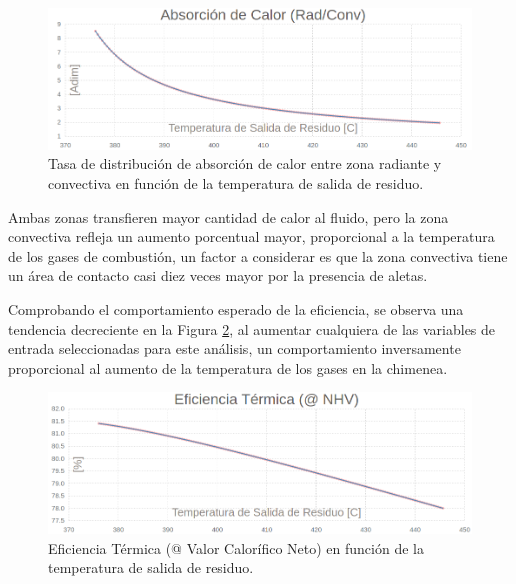 \begin{figure}[H] \begin{center}
\includegraphics[scale=0.46]{images/graph-t_out-dist}
\caption[Distribución de absorción de calor en función de Temperatura de salida de residuo]{Tasa de distribución de absorción de calor entre zona radiante y convectiva en función de la temperatura de salida de residuo.}
\label{fig:graph-t_out-dist} \end{center} \end{figure}
\par Ambas zonas transfieren mayor cantidad de calor al fluido, pero la zona convectiva refleja un aumento porcentual mayor, proporcional a la temperatura de los gases de combustión, un factor a considerar es que la zona convectiva tiene un área de contacto casi diez veces mayor por la presencia de aletas.
\par Comprobando el comportamiento esperado de la eficiencia, se observa una tendencia decreciente en la Figura \ref{fig:graph-t_out-efic}, al aumentar cualquiera de las variables de entrada seleccionadas para este análisis, un comportamiento inversamente proporcional al aumento de la temperatura de los gases en la chimenea.
\begin{figure}[H]\begin{center}
\includegraphics[scale=0.46]{images/graph-t_out-efic}
\caption[Eficiencia térmica en función de Temperatura de salida de residuo]{Eficiencia Térmica (@ Valor Calorífico Neto) en función de la temperatura de salida de residuo.}
\label{fig:graph-t_out-efic}\end{center}\end{figure}
